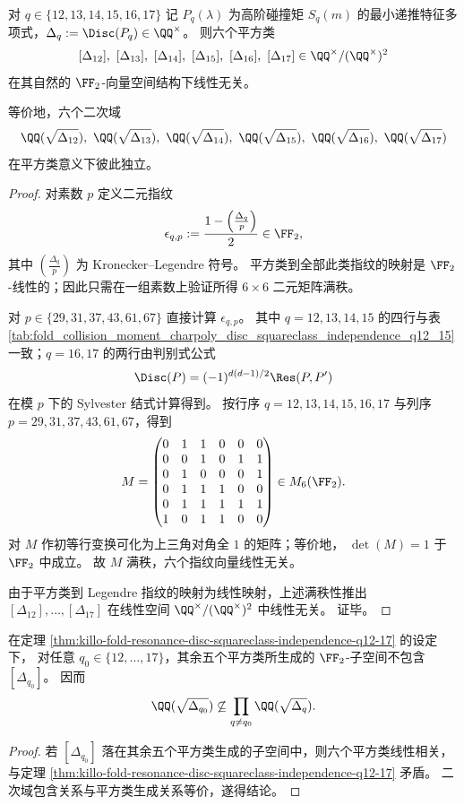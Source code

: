 \begin{theorem}[结论 7（2026-04-14 12:43:32 +08）：共振窗判别式平方类在 \texorpdfstring{$q=12,\dots,17$}{q=12..17} 的六重独立性]\label{thm:killo-fold-resonance-disc-squareclass-independence-q12-17}
对 \(q\in\{12,13,14,15,16,17\}\) 记 \(P_q(\lambda)\) 为高阶碰撞矩 \(S_q(m)\) 的最小递推特征多项式，\(\Delta_q:=\Disc(P_q)\in\QQ^\times\)。
则六个平方类
\[
[\Delta_{12}],\ [\Delta_{13}],\ [\Delta_{14}],\ [\Delta_{15}],\ [\Delta_{16}],\ [\Delta_{17}]
\in \QQ^\times/(\QQ^\times)^2
\]
在其自然的 \(\FF_2\)-向量空间结构下线性无关。

等价地，六个二次域
\[
\QQ(\sqrt{\Delta_{12}}),\ \QQ(\sqrt{\Delta_{13}}),\ \QQ(\sqrt{\Delta_{14}}),\ \QQ(\sqrt{\Delta_{15}}),\ \QQ(\sqrt{\Delta_{16}}),\ \QQ(\sqrt{\Delta_{17}})
\]
在平方类意义下彼此独立。
\end{theorem}

\begin{proof}
对素数 \(p\) 定义二元指纹
\[
\epsilon_{q,p}:=\frac{1-\left(\frac{\Delta_q}{p}\right)}{2}\in\FF_2,
\]
其中 \(\left(\frac{\Delta_q}{p}\right)\) 为 Kronecker--Legendre 符号。
平方类到全部此类指纹的映射是 \(\FF_2\)-线性的；因此只需在一组素数上验证所得 \(6\times 6\) 二元矩阵满秩。

对 \(p\in\{29,31,37,43,61,67\}\) 直接计算 \(\epsilon_{q,p}\)。
其中 \(q=12,13,14,15\) 的四行与表
\ref{tab:fold_collision_moment_charpoly_disc_squareclass_independence_q12_15}
一致；\(q=16,17\) 的两行由判别式公式
\[
\Disc(P)=(-1)^{d(d-1)/2}\Res(P,P')
\]
在模 \(p\) 下的 Sylvester 结式计算得到。
按行序 \(q=12,13,14,15,16,17\) 与列序 \(p=29,31,37,43,61,67\)，得到
\[
M=
\begin{pmatrix}
0&1&1&0&0&0\\
0&0&1&0&1&1\\
0&1&0&0&0&1\\
0&1&1&1&0&0\\
0&1&1&1&1&1\\
1&0&1&1&0&0
\end{pmatrix}\in M_{6}(\FF_2).
\]
对 \(M\) 作初等行变换可化为上三角对角全 \(1\) 的矩阵；等价地，
\(
\det(M)=1
\)
于 \(\FF_2\) 中成立。
故 \(M\) 满秩，六个指纹向量线性无关。

由于平方类到 Legendre 指纹的映射为线性映射，上述满秩性推出
\(
[\Delta_{12}],\dots,[\Delta_{17}]
\)
在线性空间 \(\QQ^\times/(\QQ^\times)^2\) 中线性无关。
证毕。
\end{proof}

\begin{corollary}[六条二次判别式角色互不生成]\label{cor:killo-fold-resonance-disc-characters-q12-17}
在定理 \ref{thm:killo-fold-resonance-disc-squareclass-independence-q12-17} 的设定下，
对任意 \(q_0\in\{12,\dots,17\}\)，其余五个平方类所生成的 \(\FF_2\)-子空间不包含 \([\Delta_{q_0}]\)。
因而
\[
\QQ(\sqrt{\Delta_{q_0}})
\not\subseteq
\prod_{q\neq q_0}\QQ(\sqrt{\Delta_q}).
\]
\end{corollary}

\begin{proof}
若 \([\Delta_{q_0}]\) 落在其余五个平方类生成的子空间中，则六个平方类线性相关，与定理
\ref{thm:killo-fold-resonance-disc-squareclass-independence-q12-17}
矛盾。
二次域包含关系与平方类生成关系等价，遂得结论。
\end{proof}
